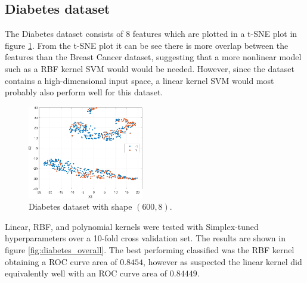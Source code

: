 \documentclass{article}
\begin{document}
    \subsection{Diabetes dataset}
        The Diabetes dataset consists of 8 features which are plotted in a t-SNE plot in figure \ref{fig:diabetes_dataset}. From the t-SNE plot it  can be see there is more overlap between the features than the Breast Cancer dataset, suggesting that a more nonlinear model such as a RBF kernel SVM would would be needed. However, since the dataset contains a high-dimensional input space, a linear kernel SVM would most probably also perform well for this dataset. 
        \begin{figure}[H]
            \centering
            \includegraphics[width=0.450\textwidth]{Assignment 1/figures/diabetes_data.pdf}
            \caption{Diabetes dataset with shape $(600,8)$.}
            \label{fig:diabetes_dataset}
        \end{figure}
        
        Linear, RBF, and polynomial kernels were tested with Simplex-tuned hyperparameters over a  10-fold cross validation set. The results are shown in figure \ref{fig:diabetes_overall}. The best performing classified was the RBF kernel obtaining a ROC curve area of $0.8454$, however as suspected the linear kernel did equivalently well with an ROC curve area of $0.84449$. 
        
\end{document}
